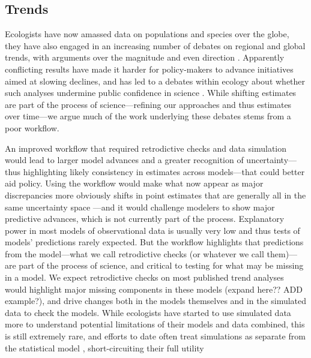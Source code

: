 \documentclass[11pt]{article}
\begin{document}
\subsection{Trends}

Ecologists have now amassed data on populations and species over the globe, they have also engaged in an increasing number of debates on regional and global trends, with arguments over the magnitude and even direction \citep{Dornelas2014,Leung2020,terry2022no,muller2024weather}. Apparently conflicting results have made it harder for policy-makers to advance initiatives aimed at slowing declines, and has led to a debates within ecology about whether such analyses undermine public confidence in science  \citep{gonzalez2016estimating}. While shifting estimates are part of the process of science---refining our approaches and thus estimates over time---we argue much of the work underlying these debates stems from a poor workflow. 

An improved workflow that required retrodictive checks and data simulation would lead to larger model advances and a greater recognition of uncertainty---thus highlighting likely consistency in estimates across models---that could better aid policy.  Using the workflow would make what now appear as major discrepancies more obviously shifts in point estimates that are generally all in the same uncertainty space \citep{Johnson2024}---and it would challenge modelers to show major predictive advances, which is not currently part of the process. Explanatory power in most models of observational data is usually very low \citep{low2014rising,moller2002much} and thus tests of models' predictions rarely expected. But the workflow highlights that predictions from the model---what we call retrodictive checks (or whatever we call them)---are part of the process of science, and critical to testing for what may be missing in a model. We expect retrodictive checks on most published trend analyses would highlight major missing components in these models (expand here?? ADD example?), and drive changes both in the models themselves and in the simulated data to check the models. While ecologists have started to use simulated data more to understand potential limitations of their models and data combined, this is still extremely rare, and efforts to date often treat simulations as separate from the statistical model \citep{Buschke2021,dove2023quantifying}, short-circuiting their full utility
\end{document}
